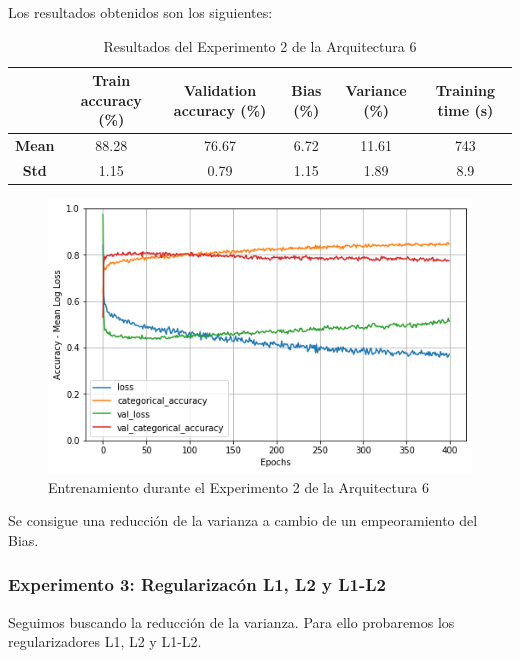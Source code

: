 \documentclass{article}
\begin{document}
            Los resultados obtenidos son los siguientes: 
            \begin{table}[!h]
				\begin{center}
					\begin{tabular}{ c | c | c | c | c | c |}
						\ & \textbf{Train accuracy (\%)} & \textbf{Validation accuracy (\%)} & \textbf{Bias (\%)} & \textbf{Variance (\%)} & \textbf{Training time (s)} \\ \hline
						\textbf{Mean} & 88.28  & 76.67 & 6.72 & 11.61 & 743  \\ \hline
						\textbf{Std} & 1.15  & 0.79 & 1.15 & 1.89 & 8.9  \\ \hline
					\end{tabular}
					\caption{Resultados del Experimento 2 de la Arquitectura 6}
					\label{tab:res-a2-e5}
				\end{center}
			\end{table}
            \begin{figure}[!h]
				\begin{center}
					\includegraphics[scale=0.5]{b-tr-a6-e2.png}		
					\caption{Entrenamiento durante el Experimento 2 de la Arquitectura 6}	
					\label{tab:tr-a6-e2}
				\end{center}
			\end{figure}
            Se consigue una reducci\'on de la varianza a cambio de un empeoramiento del Bias. 
        
        \subsubsection{Experimento 3: Regularizac\'on L1, L2 y L1-L2 }
        Seguimos buscando la reducci\'on de la varianza. Para ello probaremos los regularizadores L1, L2 y L1-L2. 
\end{document}
